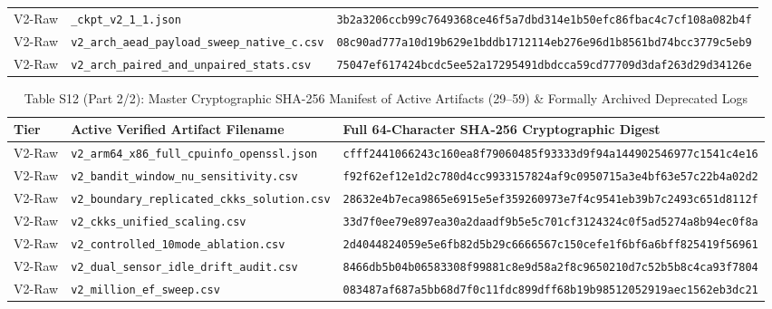 \documentclass[10pt,journal,compsoc]{IEEEtran}
\begin{document}
\begin{table}[!t]
\begin{adjustbox}{max width=\textwidth}
\begin{tabular}{@{}lll@{}}
V2-Raw & \texttt{\_ckpt\_v2\_1\_1.json} & \texttt{\scriptsize 3b2a3206ccb99c7649368ce46f5a7dbd314e1b50efc86fbac4c7cf108a082b4f} \\
V2-Raw & \texttt{v2\_arch\_aead\_payload\_sweep\_native\_c.csv} & \texttt{\scriptsize 08c90ad777a10d19b629e1bddb1712114eb276e96d1b8561bd74bcc3779c5eb9} \\
V2-Raw & \texttt{v2\_arch\_paired\_and\_unpaired\_stats.csv} & \texttt{\scriptsize 75047ef617424bcdc5ee52a17295491dbdcca59cd77709d3daf263d29d34126e} \\
\bottomrule
\end{tabular}
\end{adjustbox}
\end{table}

\begin{table}[!t]
\centering
\caption{Table S12 (Part 2/2): Master Cryptographic SHA-256 Manifest of Active Artifacts (29--59) \& Formally Archived Deprecated Logs}
\setlength{\tabcolsep}{4.2pt}
\renewcommand{\arraystretch}{1.02}
\begin{adjustbox}{max width=\textwidth}
\begin{tabular}{@{}lll@{}}
\toprule
\textbf{Tier} & \textbf{Active Verified Artifact Filename} & \textbf{Full 64-Character SHA-256 Cryptographic Digest} \\
\midrule
V2-Raw & \texttt{v2\_arm64\_x86\_full\_cpuinfo\_openssl.json} & \texttt{\scriptsize cfff2441066243c160ea8f79060485f93333d9f94a144902546977c1541c4e16} \\
V2-Raw & \texttt{v2\_bandit\_window\_nu\_sensitivity.csv} & \texttt{\scriptsize f92f62ef12e1d2c780d4cc9933157824af9c0950715a3e4bf63e57c22b4a02d2} \\
V2-Raw & \texttt{v2\_boundary\_replicated\_ckks\_solution.csv} & \texttt{\scriptsize 28632e4b7eca9865e6915e5ef359260973e7f4c9541eb39b7c2493c651d8112f} \\
V2-Raw & \texttt{v2\_ckks\_unified\_scaling.csv} & \texttt{\scriptsize 33d7f0ee79e897ea30a2daadf9b5e5c701cf3124324c0f5ad5274a8b94ec0f8a} \\
V2-Raw & \texttt{v2\_controlled\_10mode\_ablation.csv} & \texttt{\scriptsize 2d4044824059e5e6fb82d5b29c6666567c150cefe1f6bf6a6bff825419f56961} \\
V2-Raw & \texttt{v2\_dual\_sensor\_idle\_drift\_audit.csv} & \texttt{\scriptsize 8466db5b04b06583308f99881c8e9d58a2f8c9650210d7c52b5b8c4ca93f7804} \\
V2-Raw & \texttt{v2\_million\_ef\_sweep.csv} & \texttt{\scriptsize 083487af687a5bb68d7f0c11fdc899dff68b19b98512052919aec1562eb3dc21} \\

\end{tabular}
\end{adjustbox}
\end{table}
\end{document}
